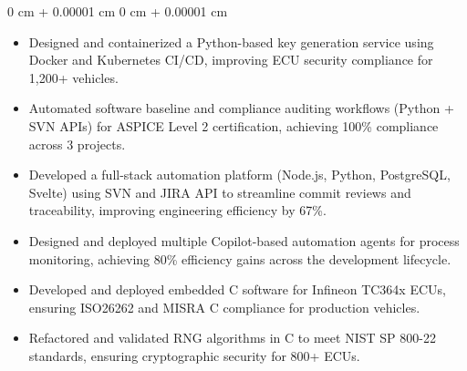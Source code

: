 \documentclass[10pt, letterpaper]{article}
\newenvironment{highlights}{
    \begin{itemize}[
        topsep=0.10 cm,
        parsep=0.10 cm,
        partopsep=0pt,
        itemsep=0pt,
        leftmargin=0 cm + 10pt
    ]
}{
    \end{itemize}
} %
\newenvironment{onecolentry}{
    \begin{adjustwidth}{
        0 cm + 0.00001 cm
    }{
        0 cm + 0.00001 cm
    }
}{
    \end{adjustwidth}
} %
\newenvironment{twocolentry}[2][]{
    \onecolentry
    \def\secondColumn{#2}
    \setcolumnwidth{\fill, 4.5 cm}
    \begin{paracol}{2}
}{
    \switchcolumn \raggedleft \secondColumn
    \end{paracol}
    \endonecolentry
} %
\begin{document}
        \vspace{0.10 cm}
        \begin{onecolentry}
            \begin{highlights}
                \item Designed and containerized a Python-based key generation service using Docker and Kubernetes CI/CD, improving ECU security compliance for 1,200+ vehicles. 
                \item Automated software baseline and compliance auditing workflows (Python + SVN APIs) for ASPICE Level 2 certification, achieving 100\% compliance across 3 projects.
                \item Developed a full-stack automation platform (Node.js, Python, PostgreSQL, Svelte) using SVN and JIRA API to streamline commit reviews and traceability, improving engineering efficiency by 67\%.
                \item Designed and deployed multiple Copilot-based automation agents for process monitoring, achieving 80\% efficiency gains across the development lifecycle.
                \item Developed and deployed embedded C software for Infineon TC364x ECUs, ensuring ISO26262 and MISRA C compliance for production vehicles.
                \item Refactored and validated RNG algorithms in C to meet NIST SP 800-22 standards, ensuring cryptographic security for 800+ ECUs.
            \end{highlights}
        \end{onecolentry}




\end{document}
